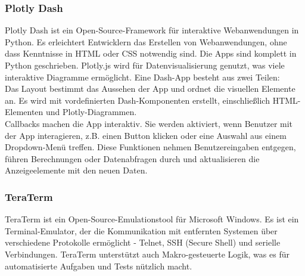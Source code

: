 \subsubsection{Plotly Dash}\label{sec: dash}
Plotly Dash\autocite{Dash} ist ein Open-Source-Framework für interaktive Webanwendungen in Python. Es erleichtert Entwicklern das Erstellen von Webanwendungen, ohne dass Kenntnisse in HTML oder CSS notwendig sind. Die Apps sind komplett in Python geschrieben. Plotly.js wird für Datenvisualisierung genutzt, was viele interaktive Diagramme ermöglicht. Eine Dash-App besteht aus zwei Teilen: \\
\vspace{3mm}
Das Layout bestimmt das Aussehen der App und ordnet die visuellen Elemente an. Es wird mit vordefinierten Dash-Komponenten erstellt, einschließlich HTML-Elementen und Plotly-Diagrammen. \\
\vspace{5mm}
Callbacks machen die App interaktiv. Sie werden aktiviert, wenn Benutzer mit der App interagieren, z.B. einen Button klicken oder eine Auswahl aus einem Dropdown-Menü treffen. Diese Funktionen nehmen Benutzereingaben entgegen, führen Berechnungen oder Datenabfragen durch und aktualisieren die Anzeigeelemente mit den neuen Daten.

\subsubsection{TeraTerm}\label{sec:teraterm}
TeraTerm\autocite{TeraTerm} ist ein Open-Source-Emulationstool für Microsoft Windows. Es ist ein Terminal-Emulator, der die Kommunikation mit entfernten Systemen über verschiedene Protokolle ermöglicht - Telnet, SSH (Secure Shell) und serielle Verbindungen. TeraTerm unterstützt auch Makro-gesteuerte Logik, was es für automatisierte Aufgaben und Tests nützlich macht.
